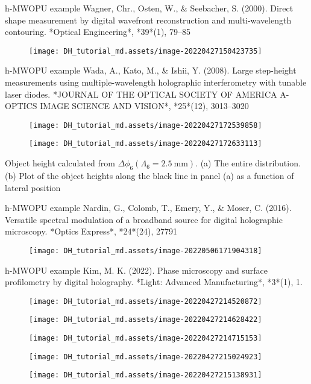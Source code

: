 \documentclass[t, aspectratio=169]{beamer}
\begin{document}
\begin{frame}{h-MWOPU example}
Wagner, Chr., Osten, W., \& Seebacher, S. (2000). Direct shape measurement by digital wavefront reconstruction and multi-wavelength contouring. *Optical Engineering*, *39*(1), 79–85
\begin{figure}
	\texttt{[image: DH\_tutorial\_md.assets/image-20220427150423735]}
\end{figure}
\end{frame}


\begin{frame}[allowframebreaks]{h-MWOPU example}
Wada, A., Kato, M., \& Ishii, Y. (2008). Large step-height measurements using multiple-wavelength holographic interferometry with tunable laser diodes. *JOURNAL OF THE OPTICAL SOCIETY OF AMERICA A-OPTICS IMAGE SCIENCE AND VISION*, *25*(12), 3013–3020
\begin{figure}
	\texttt{[image: DH\_tutorial\_md.assets/image-20220427172539858]}
\end{figure}
\begin{figure}
	\texttt{[image: DH\_tutorial\_md.assets/image-20220427172633113]}
\end{figure}
Object height calculated from $\Delta\phi_6(\Lambda_6=2.5\ \textrm{mm})$. (a) The entire distribution. (b) Plot of the object heights along the black line in panel (a) as a function of lateral position
\end{frame}


\begin{frame}{h-MWOPU example}
Nardin, G., Colomb, T., Emery, Y., \& Moser, C. (2016). Versatile spectral modulation of a broadband source for digital holographic microscopy. *Optics Express*, *24*(24), 27791
\begin{figure}
	\texttt{[image: DH\_tutorial\_md.assets/image-20220506171904318]}
\end{figure}
\end{frame}


\begin{frame}[allowframebreaks]{h-MWOPU example}
Kim, M. K. (2022). Phase microscopy and surface profilometry by digital holography. *Light: Advanced Manufacturing*, *3*(1), 1.
\begin{figure}
	\texttt{[image: DH\_tutorial\_md.assets/image-20220427214520872]}
\end{figure}
\begin{figure}
	\texttt{[image: DH\_tutorial\_md.assets/image-20220427214628422]}
\end{figure}
\begin{figure}
	\texttt{[image: DH\_tutorial\_md.assets/image-20220427214715153]}
\end{figure}
\begin{figure}
	\texttt{[image: DH\_tutorial\_md.assets/image-20220427215024923]}
\end{figure}
\begin{figure}
	\texttt{[image: DH\_tutorial\_md.assets/image-20220427215138931]}
\end{figure}
\end{frame}
\end{document}
